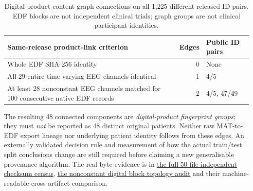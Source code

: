\begin{table}[ht]\centering\small
\caption{Digital-product content graph
connections on all 1,225 different released
ID pairs. EDF blocks are not independent
clinical trials; graph groups are not
clinical participant identities.}
\label{tab:p2-erasure-content-graph}
\begin{tabular}{p{.57\linewidth}rl}
\toprule
Same-release product-link criterion & Edges & Public ID pairs\\
\midrule
Whole EDF SHA-256 identity & 0 & None\\
All 29 entire time-varying EEG channels
identical & 1 & 4/5\\
At least 28 nonconstant EEG channels matched
for 100 consecutive native EDF records
& 2 & 4/5, 47/49\\
\bottomrule
\end{tabular}
\end{table}

The resulting 48 connected components
are \emph{digital-product fingerprint groups};
they must \emph{not} be reported as
48 distinct original patients.
Neither raw MAT-to-EDF export lineage
nor underlying patient identity follows
from these edges. An externally validated
decision rule and measurement of how the
actual train/test split conclusions change
are still required before claiming a
new generalisable provenance algorithm.
The real-byte evidence is in
\href{https://github.com/lindicaphxag-tech/kaggle/actions/runs/38388066957}
{the full 50-file independent checksum census},
\href{https://github.com/lindicaphxag-tech/kaggle/actions/runs/38543795987}
{the nonconstant digital block topology audit}
and their machine-readable cross-artifact
comparison.
